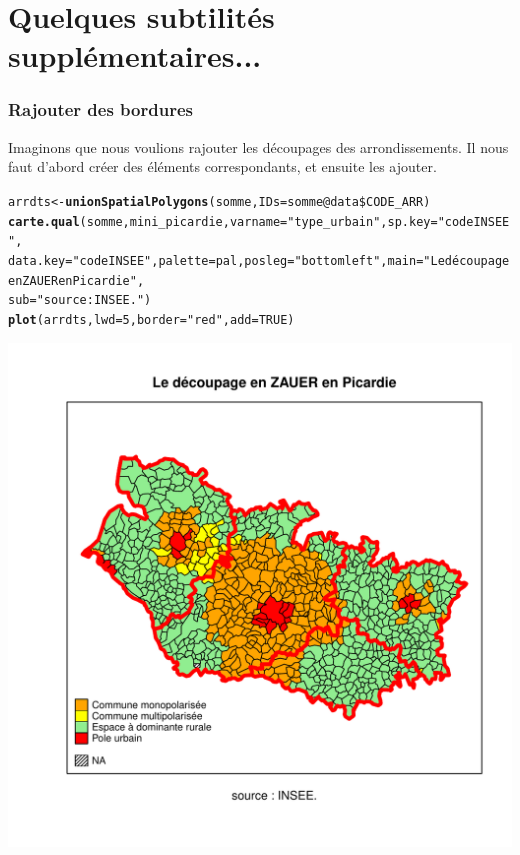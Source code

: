 \documentclass[slidetop, 10pt]{beamer}\usepackage{graphicx, color}
\makeatletter
\newcommand{\hlfunctioncall}[1]{\textcolor[rgb]{0.501960784313725,0,0.329411764705882}{\textbf{#1}}}%
\newcommand{\hlstring}[1]{\textcolor[rgb]{0.6,0.6,1}{#1}}%
\newenvironment{kframe}{%
 \def\at@end@of@kframe{}%
 \ifinner\ifhmode%
  \def\at@end@of@kframe{\end{minipage}}%
  \begin{minipage}{\columnwidth}%
 \fi\fi%
 \def\FrameCommand##1{\hskip\@totalleftmargin \hskip-\fboxsep
 \colorbox{shadecolor}{##1}\hskip-\fboxsep
     \hskip-\linewidth \hskip-\@totalleftmargin \hskip\columnwidth}%
 \MakeFramed {\advance\hsize-\width
   \@totalleftmargin\z@ \linewidth\hsize
   \@setminipage}}%
 {\par\unskip\endMakeFramed%
 \at@end@of@kframe}
\newenvironment{knitrout}{}{} %
\renewenvironment{knitrout}{\begin{tiny}}{\end{tiny}}
\makeatother
\begin{document}
\section{Quelques subtilités supplémentaires...}
\begin{frame}[fragile]
\frametitle{Rajouter des bordures}
Imaginons que nous voulions rajouter les découpages des arrondissements. Il nous faut d'abord créer des éléments correspondants, et ensuite les ajouter.

\begin{knitrout}\tiny
{}\color{fgcolor}\begin{kframe}
\begin{alltt}
arrdts <- \hlfunctioncall{unionSpatialPolygons}(somme, IDs = somme@data\$CODE_ARR)
\hlfunctioncall{carte.qual}(somme, mini_picardie, varname = \hlstring{"type_urbain"}, sp.key = \hlstring{"codeINSEE"}, 
    data.key = \hlstring{"codeINSEE"}, palette = pal, posleg = \hlstring{"bottomleft"}, main = \hlstring{"Le découpage en ZAUER en Picardie"}, 
    sub = \hlstring{"source : INSEE."})
\hlfunctioncall{plot}(arrdts, lwd = 5, border = \hlstring{"red"}, add = TRUE)
\end{alltt}
\end{kframe}

{\centering \includegraphics[width=.45\textwidth]{images/fusion} 

}


\end{knitrout}



\end{frame}
\end{document}
